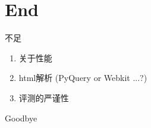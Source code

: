 \documentclass{beamer}
\begin{document}
\section{End}
\begin{frame}{不足}
    \begin{enumerate}
    \item 关于性能
    \item html解析 (PyQuery or Webkit ...?)
    \item 评测的严谨性
    \end{enumerate}
\end{frame}

\begin{frame}{Goodbye}
\end{frame}
\end{document}
